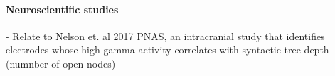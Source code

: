 \paragraph{Neuroscientific studies}
- Relate to Nelson et. al 2017 PNAS, an intracranial study that identifies electrodes whose high-gamma activity correlates with syntactic tree-depth (numnber of open nodes)

